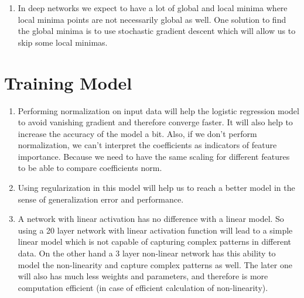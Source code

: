 \documentclass[12]{article}
\begin{document}
\begin{enumerate}[label=\textbf(\alph*)]
\[\begin{tikzpicture}
			\begin{axis}[
				scale=0.8,
				unit vector ratio*=2 1 1,
				standard,
				ymax=16,
				xtick={-4,-3,-2,-1,0,1,2,3},
				xlabel=\(\theta\),
				ylabel={\(\mathcal{L}(\theta)\)}
				]
				\addplot [thick,blue,domain=-5:3,samples=250] {(ln(1+exp(x))^2 + (3-ln(1+exp(-x)))^2 + (4-ln(1+exp(3*x)))^2)/3};
			\end{axis}
		\end{tikzpicture}
		\]
		So $\theta=-3$ will be a local minima with value $\mathcal{L}(-3)=?$, and $\theta=1$ will be the global minima with value $\mathcal{L}(1)=?$. In contrast to the previous part, using gradient descent in this setup will not always converge to the global minima and it depends on the starting point. For example if we start from a point less than $-3$ it will converge to $\theta=-3$ which is not the global minima.
		\item
		In deep networks we expect to have a lot of global and local minima where local minima points are not necessarily global as well. One solution to find the global minima is to use stochastic gradient descent which will allow us to skip some local minimas.
	\end{enumerate}

	\pagebreak
	\section{Training Model}
	\begin{enumerate}[label=\textbf{(\alph*)}]
		\item
		Performing normalization on input data will help the logistic regression model to avoid vanishing gradient and therefore converge faster. It will also help to increase the accuracy of the model a bit. Also, if we don't perform normalization, we can't interpret the coefficients as indicators of feature importance. Because we need to have the same scaling for different features to be able to compare coefficients norm.
		\item
		Using regularization in this model will help us to reach a better model in the sense of generalization error and performance.		
		\item
		A network with linear activation has no difference with a linear model. So using a 20 layer network with linear activation function will lead to a simple linear model which is not capable of capturing complex patterns in different data. On the other hand a 3 layer non-linear network has this ability to model the non-linearity and capture complex patterns as well. The later one will also has much less weights and parameters, and therefore is more computation efficient (in case of efficient calculation of non-linearity).
	\end{enumerate}
	
\end{document}
